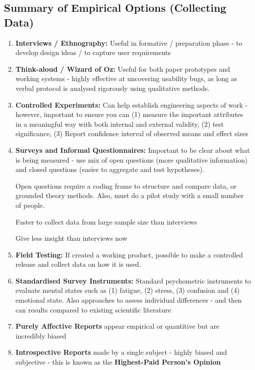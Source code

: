 \documentclass{article}
\newenvironment{pros}{\par\color[rgb]{0.066, 0.4, 0.129}}{\par}
\newenvironment{cons}{\par\color{red}}{\par}
\begin{document}
\subsection{Summary of Empirical Options (Collecting Data)}
\begin{enumerate}
    \item \textbf{Interviews / Ethnography: }Useful in formative / preparation phase - to develop design ideas / to capture user requirements
    
    \item \textbf{Think-aloud / Wizard of Oz: }Useful for both paper prototypes and working systems - highly effective at uncovering usability bugs, as long as verbal protocol is analysed rigorously using qualitative methods.
    
    \item \textbf{Controlled Experiments: }Can help establish engineering aspects of work - however, important to ensure you can (1) measure the important attributes in a meaningful way with both internal and external validity, (2) test significance, (3) Report confidence interval of observed means and effect sizes
    
    \item \textbf{Surveys and Informal Questionnaires:} Important to be clear about what is being measured - use mix of open questions (more qualitative information) and closed questions (easier to aggregate and test hypotheses).
    
    Open questions require a coding frame to structure and compare data, or grounded theory methods. Also, must do a pilot study with a small number of people.
    
    \begin{pros}
    Faster to collect data from large sample size than interviews
    \end{pros}
    
    \begin{cons}
    Give less insight than interviews now
    \end{cons}
    
    
    \item \textbf{Field Testing:} If created a working product, possible to make a controlled release and collect data on how it is used. 
    
    \item \textbf{Standardised Survey Instruments:} Standard psychometric instruments to evaluate mental states such as (1) fatigue, (2) stress, (3) confusion and (4) emotional state. Also approaches to assess individual differences - and then can results compared to existing scientific literature
    
    \begin{cons}
    \item \textbf{Purely Affective Reports} appear empirical or quantitive but are incredibly biased
    
    \item \textbf{Introspective Reports} made by a single subject - highly biased and subjective - this is known as the \textbf{Highest-Paid Person's Opinion}
    \end{cons}
\end{enumerate}
\end{document}
